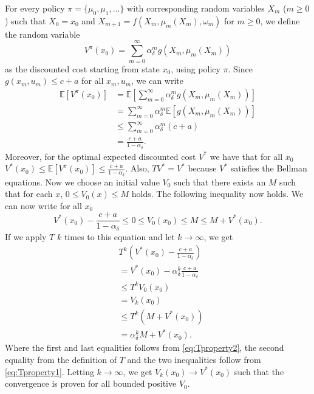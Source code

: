 For every policy $\pi=\{\mu_0,\mu_1,...\}$ with corresponding random variables $X_m$ ($m\geq0$) such that $X_0=x_0$ and $X_{m+1}=f(X_m,\mu_m(X_m),\omega_m)$ for $m\geq0$, we define the random variable
$$
V^\pi(x_0)=\sum\limits_{m=0}^{\infty}\alpha_\delta^mg(X_m,\mu_m(X_m))
$$
as the discounted cost starting from state $x_0$, using policy $\pi$.
Since $g(x_m,u_m)\leq c+a$ for all $x_m,u_m$, we can write 
\begin{equation}
\begin{split}
\mathbb{E}[V^\pi(x_0)]&=\mathbb{E}\left[\sum\limits_{m=0}^{\infty}\alpha_\delta^mg(X_m,\mu_m(X_m))\right]\\
&=\sum\limits_{m=0}^{\infty}\alpha_\delta^m\mathbb{E}[g(X_m,\mu_m(X_m))]\\
&\leq \sum\limits_{m=0}^\infty\alpha_\delta^m(c+a)\\
&=\frac{c+a}{1-\alpha_\delta}.
\end{split}
\end{equation}
Moreover, for the optimal expected discounted cost $V^*$ we have that for all $x_0$ $V^*(x_0)\leq \mathbb{E}[V^\pi(x_0)]\leq \frac{c+a}{1-\alpha_\delta}$. Also, $TV^*=V^*$ because $V^*$ satisfies the Bellman equations.
Now we choose an initial value $V_0$ such that there exists an $M$ such that for each $x$, $0\leq V_0(x)\leq M$ holds.
The following inequality now holds.
We can now write for all $x_0$
\begin{equation}V^*(x_0)-\frac{c+a}{1-\alpha_\delta}\leq 0 \leq V_0(x_0)\leq M\leq M + V^*(x_0).
\end{equation}
If we apply $T$ $k$ times to this equation and let $k\rightarrow\infty$, we get
\begin{equation}
\begin{split}
&T^k\left(V^*(x_0)-\frac{c+a}{1-\alpha_\delta}\right)\\
&=V^*(x_0)-\alpha_\delta^k\frac{c+a}{1-\alpha_\delta}\\
&\leq T^k V_0(x_0)\\
&=V_k(x_0)\\
&\leq T^k(M + V^*(x_0))\\
&= \alpha_\delta^kM+V^*(x_0).
\end{split}
\end{equation}
Where the first and last equalities follows from \eqref{eq:Tproperty2}, the second equality from the definition of $T$ and the two inequalities follow from \eqref{eq:Tproperty1}.
Letting $k\rightarrow\infty$, we get $V_k(x_0)\rightarrow V^*(x_0)$ such that the convergence is proven for all bounded positive $V_0$.

